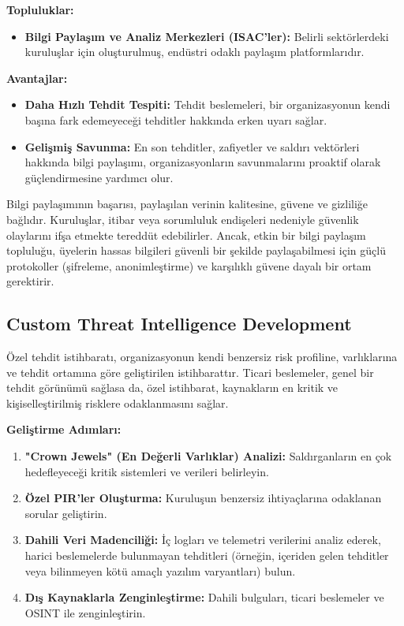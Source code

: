 \textbf{Topluluklar:}
\begin{itemize}
    \item \textbf{Bilgi Paylaşım ve Analiz Merkezleri (ISAC'ler):} Belirli sektörlerdeki kuruluşlar için oluşturulmuş, endüstri odaklı paylaşım platformlarıdır.
\end{itemize}

\textbf{Avantajlar:}
\begin{itemize}
    \item \textbf{Daha Hızlı Tehdit Tespiti:} Tehdit beslemeleri, bir organizasyonun kendi başına fark edemeyeceği tehditler hakkında erken uyarı sağlar.
    \item \textbf{Gelişmiş Savunma:} En son tehditler, zafiyetler ve saldırı vektörleri hakkında bilgi paylaşımı, organizasyonların savunmalarını proaktif olarak güçlendirmesine yardımcı olur.
\end{itemize}

Bilgi paylaşımının başarısı, paylaşılan verinin kalitesine, güvene ve gizliliğe bağlıdır. Kuruluşlar, itibar veya sorumluluk endişeleri nedeniyle güvenlik olaylarını ifşa etmekte tereddüt edebilirler. Ancak, etkin bir bilgi paylaşım topluluğu, üyelerin hassas bilgileri güvenli bir şekilde paylaşabilmesi için güçlü protokoller (şifreleme, anonimleştirme) ve karşılıklı güvene dayalı bir ortam gerektirir.

\subsection{Custom Threat Intelligence Development}

Özel tehdit istihbaratı, organizasyonun kendi benzersiz risk profiline, varlıklarına ve tehdit ortamına göre geliştirilen istihbarattır. Ticari beslemeler, genel bir tehdit görünümü sağlasa da, özel istihbarat, kaynakların en kritik ve kişiselleştirilmiş risklere odaklanmasını sağlar.

\textbf{Geliştirme Adımları:}
\begin{enumerate}
    \item \textbf{"Crown Jewels" (En Değerli Varlıklar) Analizi:} Saldırganların en çok hedefleyeceği kritik sistemleri ve verileri belirleyin.
    \item \textbf{Özel PIR'ler Oluşturma:} Kuruluşun benzersiz ihtiyaçlarına odaklanan sorular geliştirin.
    \item \textbf{Dahili Veri Madenciliği:} İç logları ve telemetri verilerini analiz ederek, harici beslemelerde bulunmayan tehditleri (örneğin, içeriden gelen tehditler veya bilinmeyen kötü amaçlı yazılım varyantları) bulun.
    \item \textbf{Dış Kaynaklarla Zenginleştirme:} Dahili bulguları, ticari beslemeler ve OSINT ile zenginleştirin.
\end{enumerate}

